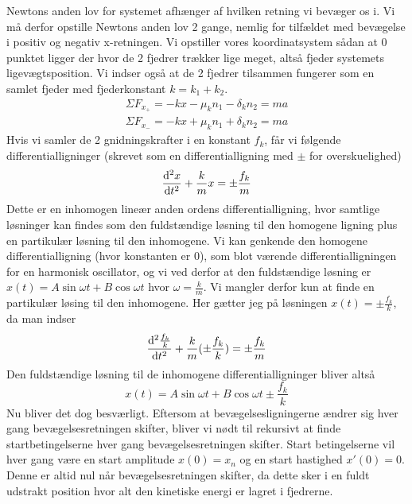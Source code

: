 Newtons anden lov for systemet afhænger af hvilken retning vi bevæger os i. 
Vi må derfor opstille Newtons anden lov 2 gange, nemlig for tilfældet med bevægelse i positiv og negativ x-retningen. 
Vi opstiller vores koordinatsystem sådan at 0 punktet ligger der hvor de 2 fjedrer trækker lige meget, altså fjeder systemets ligevægtsposition. Vi indser også at de 2 fjedrer tilsammen fungerer som en samlet fjeder med fjederkonstant $k = k_1 + k_2$.
\begin{align*}
    \Sigma F_{x_+} = -kx - \mu_k n_1 - \delta_k n_2 = ma\\
    \Sigma F_{x_-} = -kx + \mu_k n_1 + \delta_k n_2 = ma
\end{align*}
Hvis vi samler de 2 gnidningskrafter i en konstant $f_k$, får vi følgende differentialligninger (skrevet som en differentialligning med $\pm$ for overskuelighed)
\begin{equation}
    \odv[order=2]{x}{t} + \frac{k}{m}x = \pm \frac{f_k}{m}
\end{equation}
Dette er en inhomogen lineær anden ordens differentialligning\cite{Calc}, hvor samtlige løsninger kan findes 
som den fuldstændige løsning til den homogene ligning plus en partikulær løsning til den inhomogene.
Vi kan genkende den homogene differentialligning (hvor konstanten er 0), som blot værende differentialligningen for en harmonisk oscillator, 
og vi ved derfor at den fuldstændige løsning er $x(t) = A\sin\omega t + B\cos\omega t$ hvor $\omega = \frac{k}{m}$. Vi mangler derfor kun at finde en partikulær løsing til den inhomogene.
Her gætter jeg på løsningen $x(t) = \pm \frac{f_k}{k}$, da man indser
\[
     \odv[order=2]{\frac{f_k}{k}}{t} + \frac{k}{m}(\pm\frac{f_k}{k}) = \pm \frac{f_k}{m}
\]
Den fuldstændige løsning til de inhomogene differentialligninger bliver altså
\begin{equation}
    x(t) = A\sin\omega t + B\cos\omega t \pm \frac{f_k}{k}
\end{equation}
Nu bliver det dog besværligt. Eftersom at bevægelsesligningerne ændrer sig hver gang bevægelsesretningen skifter, 
bliver vi nødt til rekursivt at finde startbetingelserne hver gang bevægelsesretningen skifter.
Start betingelserne vil hver gang være en start amplitude $x(0) = x_n$ og en start hastighed $x'(0) = 0$. Denne er altid nul når bevægelsesretningen skifter, da dette sker i en fuldt udstrakt position hvor alt den kinetiske energi er lagret i fjedrerne.

